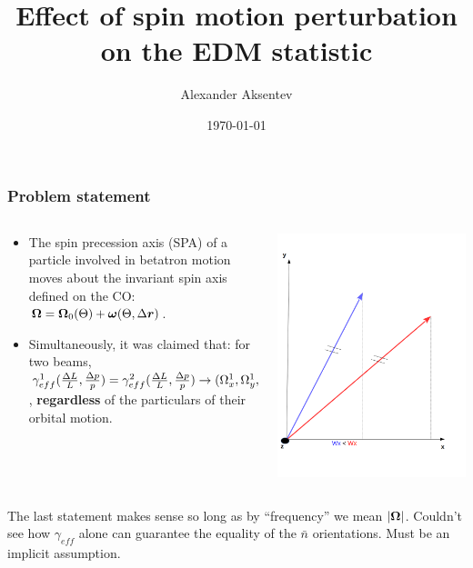 \documentclass{beamer}
\title{Effect of spin motion perturbation on the EDM statistic}
\author{Alexander Aksentev}
\date{\today}
\begin{document}
\begin{frame}
  \titlepage
\end{frame}
\begin{frame}
  \frametitle{Problem statement}
  \begin{columns}
    \begin{column}{.6\textwidth}
      \begin{itemize}
      \item The spin precession axis (SPA) of a particle involved in betatron motion moves about the invariant spin axis defined on the CO: $\boldsymbol{\Omega} = \boldsymbol{\Omega}_0(\Theta) + \boldsymbol{\omega}(\Theta, \Delta\boldsymbol r)$.
      \item Simultaneously, it was claimed that: for two beams, $\gamma_{eff}^1(\frac{\Delta L}{L}, \frac{\Delta p}{p}) = \gamma_{eff}^2(\frac{\Delta L}{L}, \frac{\Delta p}{p}) \rightarrow (\Omega_x^1, \Omega_y^1, \Omega_z^1) = (\Omega_x^2, \Omega_y^2, \Omega_z^2) $, \textbf{regardless} of the particulars of their orbital motion.
      \end{itemize}
    \end{column}
    \begin{column}{.4\textwidth}
  \begin{center}
    \includegraphics[height=.62\paperheight]{img/spin_axis_motion/presentation/nbar_arrows}
  \end{center}
  \end{column}
  \end{columns}
  The last statement makes sense so long as by ``frequency'' we mean $|\boldsymbol{\Omega}|$. Couldn't see how $\gamma_{eff}$ alone can guarantee the equality of the $\bar n$ orientations. Must be an implicit assumption.
\end{frame}
\end{document}
